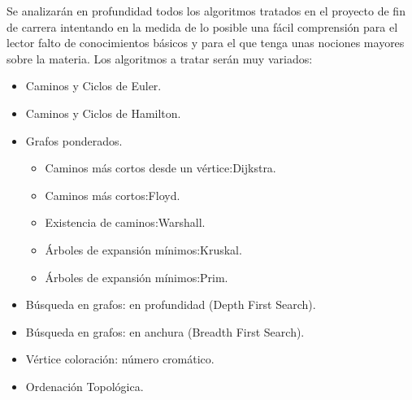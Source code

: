 \documentclass[a4paper,12pt]{article}
\begin{document}
Se analizarán en profundidad todos los algoritmos tratados en el proyecto de fin de carrera intentando en la medida de lo posible una fácil comprensión para el lector falto de conocimientos básicos y para el que tenga unas nociones mayores sobre la materia. Los algoritmos a tratar serán muy variados:
\begin{itemize}
\item Caminos y Ciclos de Euler.
\item Caminos y Ciclos de Hamilton.
\item Grafos ponderados.
\begin{itemize}
\item Caminos más cortos desde un vértice:Dijkstra.
\item Caminos más cortos:Floyd.
\item Existencia de caminos:Warshall.
\item Árboles de expansión mínimos:Kruskal.
\item Árboles de expansión mínimos:Prim.
\end{itemize}
\item Búsqueda en grafos: en profundidad (Depth First Search).
\item Búsqueda en grafos: en anchura (Breadth First Search).
\item Vértice coloración: número cromático.
\item Ordenación Topológica.
\end{itemize}
\end{document}
